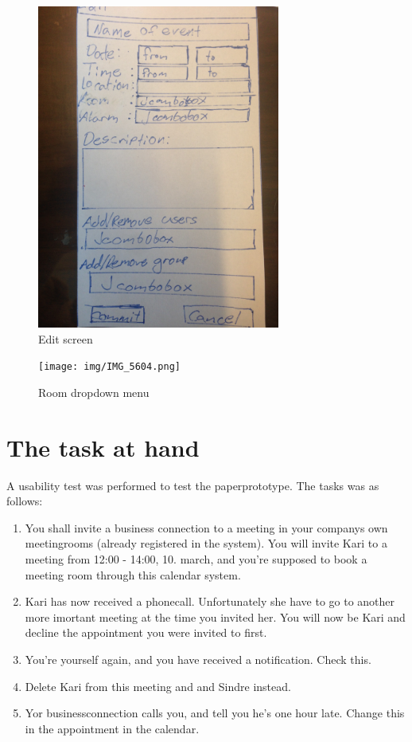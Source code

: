 \documentclass{article}
\begin{document}
\begin{figure}[h!] 
    \begin{center} 
        \includegraphics[width=8cm]{img/IMG_5602.JPG}
        \caption{Edit screen}
    \label{edit}
    \end{center}
\end{figure}

\begin{figure}[h!] 
    \begin{center} 
        \texttt{[image: img/IMG\_5604.png]}
        \caption{Room dropdown menu}
    \label{roomdropdown}
    \end{center}
\end{figure}


\section{The task at hand}
A usability test was performed to test the paperprototype. The tasks was as follows:
\begin{enumerate}

\item You shall invite a business connection to a meeting in your companys own meetingrooms (already registered in the system). You will invite Kari to a meeting from 12:00 - 14:00, 10. march, and you're supposed to book a meeting room through this calendar system.

\item Kari has now received a phonecall. Unfortunately she have to go to another more imortant meeting at the time you invited her. You will now be Kari and decline the appointment you were invited to first.

\item You're yourself again, and you have received a notification. Check this.

\item Delete Kari from this meeting and and Sindre instead.

\item Yor businessconnection calls you, and tell you he's one hour late. Change this in the appointment in the calendar.
\end{enumerate}
\end{document}
